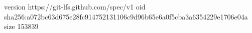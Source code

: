 version https://git-lfs.github.com/spec/v1
oid sha256:a072bc63d675e28fc914752131106c9d96b65e6a0f5cba3a6354229e1706e04a
size 153839
